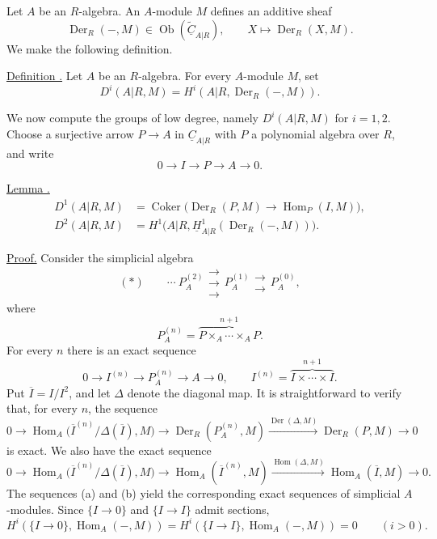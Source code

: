
Let $A$ be an $R$-algebra. An $A$-module $M$ defines an additive
sheaf
\[
 \operatorname{Der}_R(-,M)
 \in\operatorname{Ob}(\widetilde{\underline C}_{A|R}),
 \qquad X\longmapsto\operatorname{Der}_R(X,M).
\]
We make the following definition.

\underline{Definition .} Let $A$ be an $R$-algebra. For every
$A$-module $M$, set
\[
 D^i(A|R,M)=H^i(A|R,\operatorname{Der}_R(-,M)).
\]

We now compute the groups of low degree, namely $D^i(A|R,M)$ for
$i=1,2$. Choose a surjective arrow
$P\longrightarrow A$ in $\underline C_{A|R}$ with $P$ a
polynomial algebra over $R$, and write
\[
 0\longrightarrow I\longrightarrow P\longrightarrow A
 \longrightarrow0.
\]

\underline{Lemma .}
\begin{align*}
 D^1(A|R,M)
 &=\operatorname{Coker}\bigl(
   \operatorname{Der}_R(P,M)\longrightarrow
   \operatorname{Hom}_P(I,M)\bigr),\\
 D^2(A|R,M)
 &=H^1\bigl(A|R,
   \underline H^1_{A|R}(\operatorname{Der}_R(-,M))\bigr).
\end{align*}

\underline{Proof.} Consider the simplicial algebra
\[
 (*)\qquad
 \cdots\ P_A^{(2)}
 \mathrel{\substack{\longrightarrow\\[-.6ex]\longrightarrow\\[-.6ex]\longrightarrow}}
 P_A^{(1)}
 \mathrel{\substack{\longrightarrow\\[-.6ex]\longrightarrow}}
 P_A^{(0)},
\]
where
\[
 P_A^{(n)}=
 \overbrace{P\times_A\cdots\times_AP}^{n+1}.
\]
For every $n$ there is an exact sequence
\[
 0\longrightarrow I^{(n)}\longrightarrow P_A^{(n)}
 \longrightarrow A\longrightarrow0,
 \qquad
 I^{(n)}=\overbrace{I\times\cdots\times I}^{n+1}.
\]
Put $\overline I=I/I^2$, and let $\Delta$ denote the diagonal
map. It is straightforward to verify that, for every $n$, the
sequence
\[
 0\longrightarrow
 \operatorname{Hom}_A
 \bigl(\overline I^{(n)}/\Delta(\overline I),M\bigr)
 \longrightarrow\operatorname{Der}_R(P_A^{(n)},M)
 \xrightarrow{\operatorname{Der}(\Delta,M)}
 \operatorname{Der}_R(P,M)\longrightarrow0
 \tag{a}
\]
is exact. We also have the exact sequence
\[
 0\longrightarrow
 \operatorname{Hom}_A
 \bigl(\overline I^{(n)}/\Delta(\overline I),M\bigr)
 \longrightarrow\operatorname{Hom}_A(\overline I^{(n)},M)
 \xrightarrow{\operatorname{Hom}(\Delta,M)}
 \operatorname{Hom}_A(\overline I,M)\longrightarrow0.
 \tag{b}
\]
The sequences (a) and (b) yield the corresponding exact sequences
of simplicial $A$-modules. Since $\{I\longrightarrow0\}$ and
$\{I\longrightarrow I\}$ admit sections,
\[
 H^i(\{I\longrightarrow0\},\operatorname{Hom}_A(-,M))
 =H^i(\{I\longrightarrow I\},\operatorname{Hom}_A(-,M))=0
 \qquad(i>0).
\]


